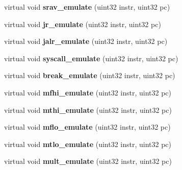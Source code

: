 \begin{DoxyCompactItemize}
\item 
\hypertarget{classCPU_ad9cfbc8582d0e893f7f651c7d5862681}{
virtual void {\bfseries srav\_\-emulate} (uint32 instr, uint32 pc)}
\label{classCPU_ad9cfbc8582d0e893f7f651c7d5862681}

\item 
\hypertarget{classCPU_a4f76c106a8442177c26c4d9e8f21ab00}{
virtual void {\bfseries jr\_\-emulate} (uint32 instr, uint32 pc)}
\label{classCPU_a4f76c106a8442177c26c4d9e8f21ab00}

\item 
\hypertarget{classCPU_ac8473a1739c9f36114c17ca090c96029}{
virtual void {\bfseries jalr\_\-emulate} (uint32 instr, uint32 pc)}
\label{classCPU_ac8473a1739c9f36114c17ca090c96029}

\item 
\hypertarget{classCPU_a69221569c1d91b9846ff0b7298b1ed0a}{
virtual void {\bfseries syscall\_\-emulate} (uint32 instr, uint32 pc)}
\label{classCPU_a69221569c1d91b9846ff0b7298b1ed0a}

\item 
\hypertarget{classCPU_a995494b1b1fd54168872ca4f42b29660}{
virtual void {\bfseries break\_\-emulate} (uint32 instr, uint32 pc)}
\label{classCPU_a995494b1b1fd54168872ca4f42b29660}

\item 
\hypertarget{classCPU_a8da9a59554ff9a53472709ee814e74e0}{
virtual void {\bfseries mfhi\_\-emulate} (uint32 instr, uint32 pc)}
\label{classCPU_a8da9a59554ff9a53472709ee814e74e0}

\item 
\hypertarget{classCPU_a64b4ec5e152118af94b96d6d4c91fe17}{
virtual void {\bfseries mthi\_\-emulate} (uint32 instr, uint32 pc)}
\label{classCPU_a64b4ec5e152118af94b96d6d4c91fe17}

\item 
\hypertarget{classCPU_a2d07b1303a8304c8735a73303e8d5910}{
virtual void {\bfseries mflo\_\-emulate} (uint32 instr, uint32 pc)}
\label{classCPU_a2d07b1303a8304c8735a73303e8d5910}

\item 
\hypertarget{classCPU_ae3c368a547d34fc80304e37803b72aa4}{
virtual void {\bfseries mtlo\_\-emulate} (uint32 instr, uint32 pc)}
\label{classCPU_ae3c368a547d34fc80304e37803b72aa4}

\item 
\hypertarget{classCPU_a647a5f5891972fd74c5890912a8555c0}{
virtual void {\bfseries mult\_\-emulate} (uint32 instr, uint32 pc)}
\label{classCPU_a647a5f5891972fd74c5890912a8555c0}


\end{DoxyCompactItemize}
